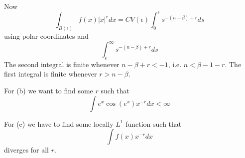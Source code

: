 \documentclass{amsart}
\begin{document}
Now
\[
\int_{B(\epsilon)} f(x) |x|^r dx = C V(\epsilon) \int_0^{\epsilon} s^{-(n-\beta)+r} ds
\]
using polar coordinates and
\[
\int_{\epsilon}^\infty s^{-(n-\beta)+r} ds
\]
The second integral is finite whenever $n-\beta+r< -1$, i.e. $n < \beta - 1 - r$.  The first integral is finite whenever $r > n-\beta$.  

For (b) we want to find some $r$ such that
\[
\int e^x \cos(e^x) x^{-r} dx <\infty
\]

For (c) we have to find some locally $L^1$ function such that 
\[
\int f(x) x^{-r} dx 
\]
diverges for all $r$.

\begin{thebibliography}{CCCC}
\end{thebibliography}
\end{document}
